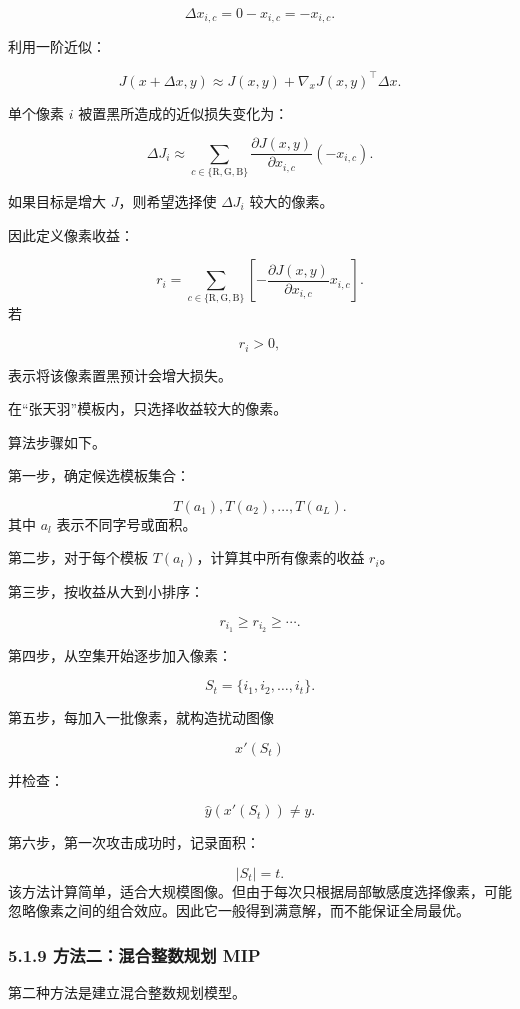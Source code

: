 ﻿\documentclass[UTF8,zihao=-4,fontset=none]{ctexart}
\begin{document}
\[
\Delta x_{i,c}
=
0-x_{i,c}
=
-x_{i,c}.
\]

利用一阶近似：

\[
J(x+\Delta x,y)
\approx
J(x,y)+\nabla_xJ(x,y)^\top\Delta x.
\]

单个像素 \(i\) 被置黑所造成的近似损失变化为：

\[
\Delta J_i
\approx
\sum_{c\in\{\mathrm{R},\mathrm{G},\mathrm{B}\}}
\frac{\partial J(x,y)}{\partial x_{i,c}}
(-x_{i,c}).
\]

如果目标是增大 \(J\)，则希望选择使 \(\Delta J_i\) 较大的像素。

因此定义像素收益：

\[
r_i
=
\sum_{c\in\{\mathrm{R},\mathrm{G},\mathrm{B}\}}
\left[
-\frac{\partial J(x,y)}{\partial x_{i,c}}x_{i,c}
\right].
\]
\noindent 若

\[
r_i>0,
\]

表示将该像素置黑预计会增大损失。

在“张天羽”模板内，只选择收益较大的像素。

算法步骤如下。

第一步，确定候选模板集合：

\[
T(a_1),T(a_2),\ldots,T(a_L).
\]
\noindent 其中 \(a_l\) 表示不同字号或面积。

第二步，对于每个模板 \(T(a_l)\)，计算其中所有像素的收益 \(r_i\)。

第三步，按收益从大到小排序：

\[
r_{i_1}\ge r_{i_2}\ge \cdots.
\]

第四步，从空集开始逐步加入像素：

\[
S_t=\{i_1,i_2,\ldots,i_t\}.
\]

第五步，每加入一批像素，就构造扰动图像

\[
x'(S_t)
\]

并检查：

\[
\hat y(x'(S_t))\ne y.
\]

第六步，第一次攻击成功时，记录面积：

\[
|S_t|=t.
\]
\noindent 该方法计算简单，适合大规模图像。但由于每次只根据局部敏感度选择像素，可能忽略像素之间的组合效应。因此它一般得到满意解，而不能保证全局最优。

\subsubsection*{5.1.9 方法二：混合整数规划 MIP}
{}

第二种方法是建立混合整数规划模型。
\end{document}
